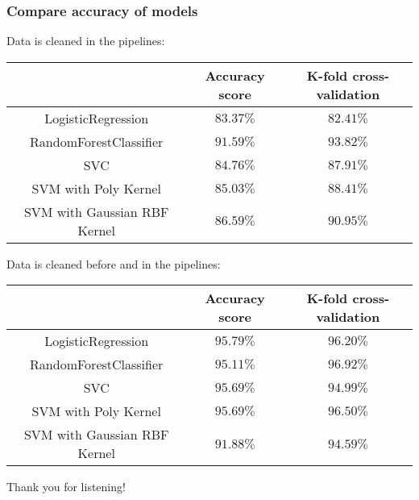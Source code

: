\documentclass[10pt]{beamer}
\theoremstyle{definition}
\theoremstyle{remark}
\numberwithin{equation}{section}
\begin{document}
\begin{frame}
	\frametitle{Compare accuracy of models}
	Data is cleaned in the pipelines:
		\begin{center}
		\begin{tabular}{ | c | c| c | } 
			\hline
			& Accuracy score & K-fold cross-validation \\ 
			\hline
			LogisticRegression & $83.37 \%$ & $82.41 \%$ \\ 
			\hline
			RandomForestClassifier & $91.59 \%$ & $93.82 \%$ \\ 
			\hline
			SVC & $84.76 \%$ & $87.91 \%$ \\ 
			\hline
			SVM with Poly Kernel & $85.03 \%$ & $88.41 \%$  \\ 
			\hline
			SVM with Gaussian RBF Kernel & $86.59 \%$ & $90.95 \%$  \\ 
			\hline
		\end{tabular}
	\end{center}
	Data is cleaned before and in the pipelines:
		\begin{center}
		\begin{tabular}{ | c | c| c | } 
			\hline
			& Accuracy score & K-fold cross-validation \\ 
			\hline
			LogisticRegression & $95.79 \%$ & $96.20 \%$ \\ 
			\hline
			RandomForestClassifier & $95.11 \%$ & $96.92 \%$ \\ 
			\hline
			SVC & $95.69 \%$ & $94.99 \%$ \\ 
			\hline
			SVM with Poly Kernel & $95.69 \%$ & $96.50 \%$  \\ 
			\hline
			SVM with Gaussian RBF Kernel & $91.88 \%$ & $94.59 \%$  \\ 
			\hline
		\end{tabular}
	\end{center}

\end{frame}


\begin{frame}
	\centering \large Thank you for listening!
\end{frame}
\end{document}
